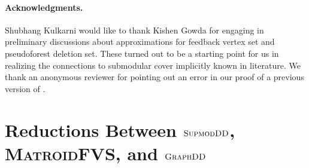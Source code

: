 \documentclass{article}
\newtheorem{remark}{Remark}[section]
\newcommand{\mfvs}{\textsc{MatroidFVS}\xspace}
\newcommand{\densitydeletionset}{\textsc{GraphDD}\xspace}
\newcommand{\dds}{\ensuremath{\textsc{GraphDD}}\xspace}
\newcommand{\sdds}{\ensuremath{\textsc{SupmodDD}}\xspace}
\newcommand{\setcover}{\textsc{SetCover}\xspace}
\begin{document}
\iffalse
\begin{remark}
    Since we have a bicriteria approximation algorithm for \densitydeletionset by \Cref{thm:orientation-LP-bicriteria}, it is natural to wonder whether the bicriteria approximation would imply anything interesting for \setcover via the reduction of  \Cref{thm:DDS-logn-hard}. Unfortunately, our reduction is brittle from the viewpoint of bicriteria approximations---the densest subgraph of the \densitydeletionset instance constructed via the reduction is already very close to the target density in the reduction. Consequently, the empty set would be a valid bicriteria approximate solution which gives us no information about the set cover instance.
\end{remark}
\fi 

\paragraph{Acknowledgments.}
 Shubhang Kulkarni would like to thank Kishen Gowda for engaging in preliminary discussions about approximations for feedback vertex set and pseudoforest deletion set. These turned out to be a starting point for us in realizing the connections to submodular cover implicitly known in literature. We thank an anonymous reviewer for pointing out an error in our proof of a previous version of  .
 




\appendix
\section{Reductions Between \sdds, \mfvs, and \dds}\label{appendix:sec:reductions}
\end{document}
